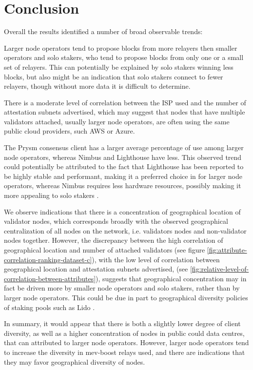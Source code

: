 \documentclass[conference]{IEEEtran}
\begin{document}
\section{Conclusion}
\label{sec:conclusion}

Overall the results identified a number of broad observable trends:

Larger node operators tend to propose blocks from more relayers then smaller operators and solo stakers, who tend to propose blocks from only one or a small set of relayers.  This can potentially be explained by solo stakers winning less blocks, but also might be an indication that solo stakers connect to fewer relayers, though without more data it is difficult to determine.

There is a moderate level of correlation between the ISP used and the number of attestation subnets advertised, which may suggest that nodes that have multiple validators attached, usually larger node operators, are often using the same public cloud providers, such AWS or Azure.

The Prysm consensus client has a larger average percentage of use among larger node operators, whereas Nimbus and Lighthouse have less. This observed trend could potentially be attributed to the fact that Lighthouse has been reported to be highly stable and performant, making it a preferred choice in for larger node operators, whereas Nimbus requires less hardware resources, possibly making it more appealing to solo stakers \cite{ranjan2023}.

We observe indications that there is a concentration of geographical location of validator nodes, which corresponds broadly with the observed geographical centralization of all nodes on the network, i.e. validators nodes and non-validator nodes together. However, the discrepancy between the high correlation of geographical location and number of attached validators (see figure \ref{fig:attribute-correlation-ranking-dataset-c}), with the low level of correlation between geographical location and attestation subnets advertised, (see \ref{fig:relative-level-of-correlation-between-attributes}), suggests that geographical concentration may in fact be driven more by smaller node operators and solo stakers, rather than by larger node operators.  This could be due in part to geographical diversity policies of staking pools such as Lido \cite{vanom2024}.

In summary, it would appear that there is both a slightly lower degree of client diversity, as well as a higher concentration of nodes in public could data centres, that can attributed to larger node operators.  However, larger node operators tend to increase the diversity in mev-boost relays used, and there are indications that they may favor geographical diversity of nodes.
\end{document}
